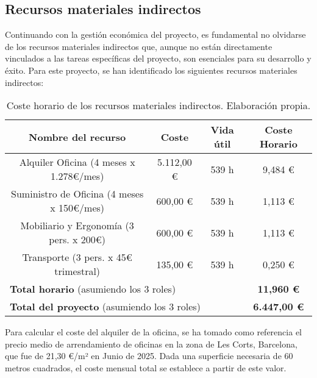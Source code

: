 \subsection{Recursos materiales indirectos}
Continuando con la gestión económica del proyecto, es fundamental no olvidarse 
de los recursos materiales indirectos que, aunque no están directamente vinculados 
a las tareas específicas del proyecto, son esenciales para su desarrollo y éxito. 
Para este proyecto, se han identificado los siguientes recursos materiales indirectos:

\begin{table}[H]
    \begin{center}
    \begin{tabular}{|c|c|c|c|}
        \hline
        \textbf{Nombre del recurso} & \textbf{Coste} & \textbf{Vida útil} & \textbf{Coste Horario}\\ 
        \hline
        Alquiler Oficina (4 meses x 1.278€/mes) & 5.112,00 € & 539 h & 9,484 € \\
        Suministro de Oficina (4 meses x 150€/mes) & 600,00 € & 539 h & 1,113 € \\
        Mobiliario y Ergonomía (3 pers. x 200€) & 600,00 € & 539 h & 1,113 € \\
        Transporte (3 pers. x 45€ trimestral) & 135,00 € & 539 h & 0,250 € \\
        \hline
        \multicolumn{3}{|l|}{\textbf{Total horario} (asumiendo los 3 roles)} & \textbf{11,960 €} \\
        \hline
        \multicolumn{3}{|l|}{\textbf{Total del proyecto} (asumiendo los 3 roles)} & \textbf{6.447,00 €} \\
        \hline
    \end{tabular}
    \caption{Coste horario de los recursos materiales indirectos. Elaboración propia.}
    \label{tab:recursos_indirectos}
    \end{center}
\end{table}

Para calcular el coste del alquiler de la oficina, se ha tomado como referencia el 
precio medio de arrendamiento de oficinas en la zona de Les Corts, Barcelona, 
que fue de 21,30 €/m² en Junio de 2025\cite{properfy}. Dada una superficie 
necesaria de 60 metros cuadrados, el coste mensual total se establece a partir de este valor.